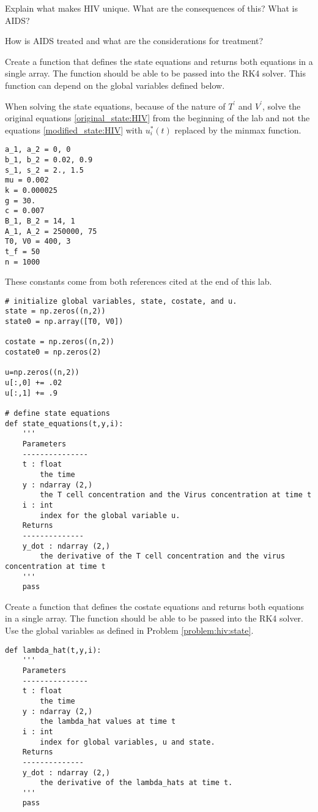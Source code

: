 
Explain what makes HIV unique. What are the consequences of this? What is AIDS?
\label{problem:hiv:virusunderstanding}

How is AIDS treated and what are the considerations for treatment?
\label{problem:hiv:treatment}

Create a function that defines the state equations and returns both equations in a single array. The function should be able to be passed into the RK4 solver. This function can depend on the global variables defined below.

\begin{warn}
When solving the state equations, because of the nature of $T^\prime$ and $V^\prime$, solve the original equations \eqref{original_state:HIV} from the beginning of the lab and not the equations \eqref{modified_state:HIV} with $u_i^*(t)$ replaced by the minmax function.
\end{warn}

\begin{lstlisting}
a_1, a_2 = 0, 0
b_1, b_2 = 0.02, 0.9
s_1, s_2 = 2., 1.5
mu = 0.002
k = 0.000025
g = 30.
c = 0.007
B_1, B_2 = 14, 1
A_1, A_2 = 250000, 75
T0, V0 = 400, 3
t_f = 50
n = 1000
\end{lstlisting}
These constants come from both references cited at the end of this lab. 

\begin{lstlisting}
# initialize global variables, state, costate, and u.
state = np.zeros((n,2))
state0 = np.array([T0, V0])
	
costate = np.zeros((n,2))
costate0 = np.zeros(2)

u=np.zeros((n,2))
u[:,0] += .02
u[:,1] += .9

# define state equations
def state_equations(t,y,i):
	'''
	Parameters
	---------------
	t : float
		the time
	y : ndarray (2,)
		the T cell concentration and the Virus concentration at time t
	i : int
		index for the global variable u.
	Returns
	--------------
	y_dot : ndarray (2,)
		the derivative of the T cell concentration and the virus concentration at time t
	'''
	pass
\end{lstlisting}
\label{problem:hiv:state}

Create a function that defines the costate equations and returns both equations in a single array. The function should be able to be passed into the RK4 solver. Use the global variables as defined in Problem \ref{problem:hiv:state}.

\begin{lstlisting}
def lambda_hat(t,y,i):
	'''
	Parameters
	---------------
	t : float
		the time
	y : ndarray (2,)
		the lambda_hat values at time t
	i : int
		index for global variables, u and state.
	Returns
	--------------
	y_dot : ndarray (2,)
		the derivative of the lambda_hats at time t.
	'''
	pass
\end{lstlisting}

